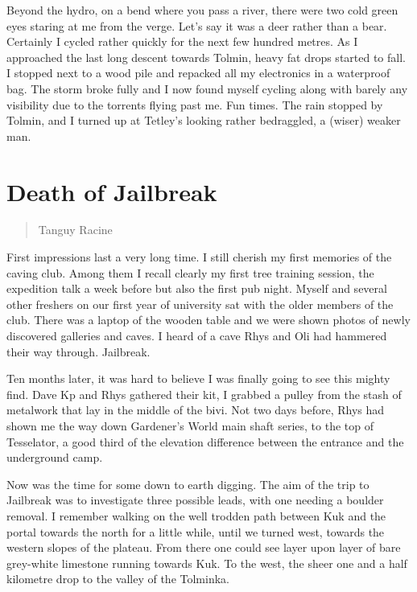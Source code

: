 \documentclass[onecolumn]{book}
\begin{document}
Beyond the hydro, on a bend where you pass a river, there were two cold green eyes staring at me from the verge. Let's say it was a deer rather than a bear. Certainly I cycled rather quickly for the next few hundred metres.
As I approached the last long descent towards Tolmin, heavy fat drops started to fall. I stopped next to a wood pile and repacked all my electronics in a waterproof bag. The storm broke fully and I now found myself cycling along with barely any visibility due to the torrents flying past me. Fun times.
The rain stopped by Tolmin, and I turned up at Tetley's looking rather bedraggled, a (wiser) weaker man.

\section{Death of Jailbreak}
\begin{verse}
Tanguy Racine
\end{verse}
First impressions last a very long time. I still cherish my first memories of the caving club. Among them I recall clearly my first tree training session, the expedition talk a week before but also the first pub night. Myself and several other freshers on our first year of university sat with the older members of the club. There was a laptop of the wooden table and we were shown photos of newly discovered galleries and caves. I heard of a cave Rhys and Oli had hammered their way through. Jailbreak. 

Ten months later, it was hard to believe I was finally going to see this mighty find. Dave Kp and Rhys gathered their kit, I grabbed a pulley from the stash of metalwork that lay in the middle of the bivi. Not two days before, Rhys had shown me the way down Gardener's World main shaft series, to the top of Tesselator, a good third of the elevation difference between the entrance and the underground camp. 

Now was the time for some down to earth digging. The aim of the trip to Jailbreak was to investigate three possible leads, with one needing a boulder removal. I remember walking on the well trodden path between Kuk and the portal towards the north for a little while, until we turned west, towards the western slopes of the plateau. From there one could see layer upon layer of bare grey-white limestone running towards Kuk. To the west, the sheer one and a half kilometre drop to the valley of the Tolminka. 
\end{document}
